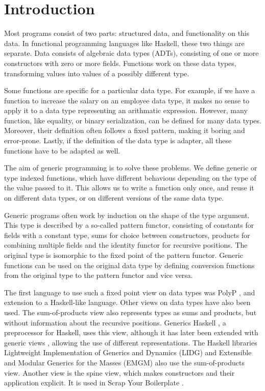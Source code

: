 \chapter{Introduction}

Most programs consist of two parts: structured data, and functionality
on this data. In functional programming languages like Haskell, these
two things are separate. Data consists of algebraic data types (ADTs),
consisting of one or more constructors with zero or more fields.
Functions work on these data types, transforming values into values of
a possibly different type.

Some functions are specific for a particular data type. For example,
if we have a function to increase the salary on an employee data type,
it makes no sense to apply it to a data type representing an
arithmatic expression. However, many function, like equality, or
binary serialization, can be defined for many data types. Moreover,
their definition often follows a fixed pattern, making it boring and
error-prone. Lastly, if the definition of the data type is adapter,
all these functions have to be adapted as well.

The aim of generic programming is to solve these problems. We define
generic or type indexed functions, which have different behavious
depending on the type of the value passed to it. This allows us to
write a function only once, and reuse it on different data types, or
on different versions of the same data type.

Generic programs often work by induction on the shape of the type
argument. This type is described by a so-called pattern functor,
consisting of constants for fields with a constant type, sums for
choice between constructors, products for combining multiple fields
and the identity functor for recursive positions. The original type is
isomorphic to the fixed point of the pattern functor. Generic
functions can be used on the original data type by defining conversion
functions from the original type to the pattern functor and vice
versa.

The first language to use such a fixed point view on data types was
PolyP \cite{polyp}, and extension to a Haskell-like language. Other
views on data types have also been used. The sum-of-products view also
represents types as sums and products, but without information about
the recursive positions. Generics Haskell
\cite{Hinze00polytypicvalues}, a preprocessor for Haskell, uses this
view, although it has later been extended with generic views
\cite{Holdermans06genericviews}, allowing the use of different
representations. The Haskell libraries Lightweight Implementation of
Generics and Dynamics (LIDG) \cite{Cheney02alightweight} and
Extensible and Modular Generics for the Masses (EMGM)
\cite{Hinze04genericsfor, emgm} also use the sum-of-products view.
Another view is the spine view, which makes constructors and their
application explicit. It is used in Scrap Your Boilerplate
\cite{Lämmel03scrapyour, Lämmel04scrapmore, Lämmel05scrapyour,
Hinze06reloaded, Hinze06revolutions}.

